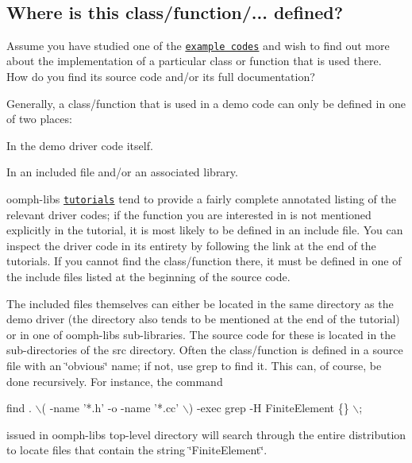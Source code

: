 ~\newline
~\newline
 \hypertarget{index_includes}{}\subsection{Where is this class/function/... defined?}\label{index_includes}
Assume you have studied one of the \href{../../example_code_list/html/index.html}{\tt example codes} and wish to find out more about the implementation of a particular class or function that is used there. How do you find its source code and/or its full documentation?

Generally, a class/function that is used in a demo code can only be defined in one of two places\+:
\begin{DoxyEnumerate}
\item In the demo driver code itself.
\item In an included file and/or an associated library.
\end{DoxyEnumerate}{\ttfamily oomph-\/lib\textquotesingle{}s} \href{../../example_code_list/html/index.html}{\tt tutorials} tend to provide a fairly complete annotated listing of the relevant driver codes; if the function you are interested in is not mentioned explicitly in the tutorial, it is most likely to be defined in an include file. You can inspect the driver code in its entirety by following the link at the end of the tutorials. If you cannot find the class/function there, it must be defined in one of the include files listed at the beginning of the source code.

The included files themselves can either be located in the same directory as the demo driver (the directory also tends to be mentioned at the end of the tutorial) or in one of {\ttfamily oomph-\/lib\textquotesingle{}s} sub-\/libraries. The source code for these is located in the sub-\/directories of the {\ttfamily src} directory. Often the class/function is defined in a source file with an \char`\"{}obvious\char`\"{} name; if not, use {\ttfamily grep} to find it. This can, of course, be done recursively. For instance, the command


\begin{DoxyCode}
find . \(\backslash\)( -name \textcolor{stringliteral}{'*.h'} -o -name \textcolor{stringliteral}{'*.cc'} \(\backslash\)) -exec grep -H FiniteElement \{\} \(\backslash\);  
\end{DoxyCode}


issued in {\ttfamily oomph-\/lib\textquotesingle{}s} top-\/level directory will search through the entire distribution to locate files that contain the string \char`\"{}\+Finite\+Element\char`\"{}.

